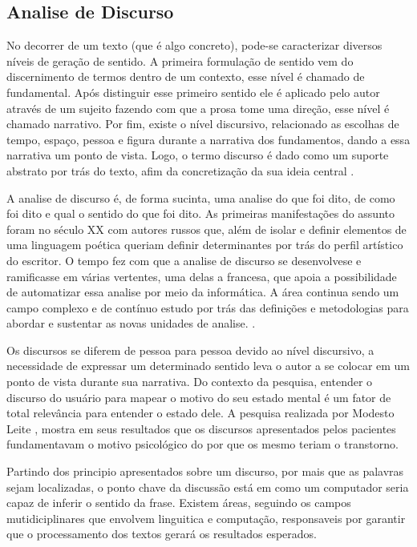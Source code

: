 \subsection{Analise de Discurso}
No decorrer de um texto (que é algo concreto), pode-se caracterizar diversos níveis de geração de sentido.
A primeira formulação de sentido vem do discernimento de termos dentro de um contexto, esse nível é chamado de fundamental. Após distinguir esse primeiro sentido ele é aplicado pelo autor através de um sujeito fazendo com que a prosa tome uma direção, esse nível é chamado narrativo. Por fim, existe o nível discursivo, relacionado as escolhas de tempo, espaço, pessoa e figura durante a narrativa dos fundamentos, dando a essa narrativa um ponto de vista. Logo, o termo discurso é dado como um suporte abstrato por trás do texto, afim da concretização da sua ideia central \cite[13-17]{gregolin1995ad}.

A analise de discurso é, de forma sucinta, uma analise do que foi dito, de como foi dito e qual o sentido do que foi dito. As primeiras manifestações do assunto foram no século XX com autores russos que, além de isolar e definir elementos de uma linguagem poética queriam definir determinantes por trás do perfil artístico do escritor. O tempo fez com que a analise de discurso se desenvolvese e ramificasse em várias vertentes, uma delas a francesa, que apoia a possibilidade de automatizar essa analise por meio da informática. A área continua sendo um campo complexo e de contínuo estudo por trás das definições e metodologias para abordar e sustentar as novas unidades de analise. \cite[22]{souza2006ad}.

Os discursos se diferem de pessoa para pessoa devido ao nível discursivo, a necessidade de expressar um determinado sentido leva o autor a se colocar em um ponto de vista durante sua narrativa. Do contexto da pesquisa, entender o discurso do usuário para mapear o motivo do seu estado mental é um fator de total relevância para entender o estado dele. A pesquisa realizada por Modesto Leite \cite[134]{modesto2005adepre}, mostra em seus resultados que os discursos apresentados pelos pacientes fundamentavam o motivo psicológico do por que os mesmo teriam o transtorno. 

Partindo dos principio apresentados sobre um discurso, por mais que as palavras sejam localizadas, o ponto chave da discussão está em como um computador seria capaz de inferir o sentido da frase. Existem áreas, seguindo os campos mutidiciplinares que envolvem linguitica e computação, responsaveis por garantir que o processamento dos textos gerará os resultados esperados.
